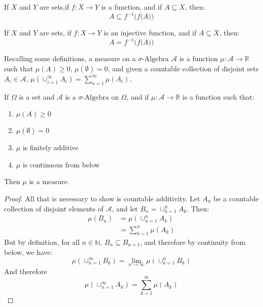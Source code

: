     \begin{theorem}
        If $X$ and $Y$ are sets,if
        $f:X\rightarrow{Y}$ is a function, and if
        $A\subseteq{X}$, then:
        \begin{equation}
            A\subseteq{f^{-1}\Big(f\big(A\big)\Big)}
        \end{equation}
    \end{theorem}
    \begin{theorem}
        If $X$ and $Y$ are sets, if
        $f:X\rightarrow{Y}$ is an injective function,
        and if $A\subseteq{X}$, then:
        \begin{equation}
            A=f^{-1}\Big(f\big(A\big)\Big)
        \end{equation}
    \end{theorem}
    Recalling some definitions, a measure on a
    $\sigma\textrm{-Algebra}$ $\mathcal{A}$ is a function
    $\mu:\mathcal{A}\rightarrow\mathbb{R}$ such that
    $\mu(A)\geq{0}$, $\mu(\emptyset)=0$, and given a countable
    collection of disjoint sets $A_{i}\in\mathcal{A}$,
    $\mu(\cup_{i=1}^{\infty}A_{i})=\sum_{n=1}^{\infty}\mu(A_{i})$.
    \begin{theorem}
        If $\Omega$ is a set and $\mathcal{A}$ is a
        $\sigma\text{-Algebra}$ on $\Omega$, and if
        $\mu:\mathcal{A}\rightarrow\mathbb{R}$ is a function such that:
        \begin{enumerate}
            \item $\mu(A)\geq{0}$
            \item $\mu(\emptyset)=0$
            \item $\mu$ is finitely additive
            \item $\mu$ is continuous from below
        \end{enumerate}
        Then $\mu$ is a measure.
    \end{theorem}
    \begin{proof}
        All that is necessary to show is countable additivity.
        Let $A_{n}$ be a countable collection of disjoint elements
        of $\mathcal{A}$, and let $B_{n}=\cup_{k=1}^{n}A_{k}$.
        Then:
        \begin{align}
            \mu(B_{n})&=\mu(\cup_{n=1}^{n}A_{k})\\
            &=\sum_{k=1}^{n}\mu(A_{k})
        \end{align}
        But by definition, for all $n\in\mathbb{N}$,
        $B_{n}\subseteq{B_{n+1}}$, and therefore by continuity from
        below, we have:
        \begin{equation}
            \mu(\cup_{n=1}^{\infty}B_{k})
            =\lim_{n\rightarrow\infty}\mu(\cup_{k=1}^{n}B_{k})
        \end{equation}
        And therefore
        \begin{equation}
            \mu(\cup_{n=1}^{\infty}A_{k})=\sum_{k=1}^{\infty}\mu(A_{k})
        \end{equation}
    \end{proof}
